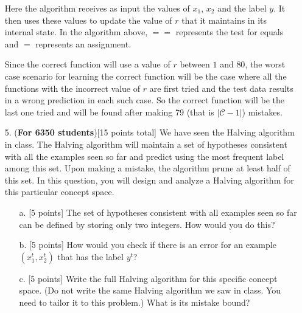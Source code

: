 \begin{enumerate}
Here the algorithm receives as input the values of $x_1$, $x_2$ and the label $y$. It then uses these values to update the value of $r$ that it maintains in its internal state. In the algorithm above, $==$ represents the test for equals and $=$ represents an assignment.

Since the correct function will use a value of $r$ between $1$ and $80$, the worst case scenario for learning the correct function will be the case where all the functions with the incorrect value of $r$ are first tried and the test data results in a wrong prediction in each such case. So the correct function will be the last one tried and will be found after making 79 (that is $\left | \mathcal{C} - 1 \right |$) mistakes. 

\item[5.] ({\bf For 6350 students})[15 points total] We have seen the
  Halving algorithm in class. The Halving algorithm will maintain a
  set of hypotheses consistent with all the examples seen so far and
  predict using the most frequent label among this set. Upon making a
  mistake, the algorithm prune at least half of this set. In this
  question, you will design and analyze a Halving algorithm for this
  particular concept space.

  \begin{enumerate}
  \item[a.] [5 points] The set of hypotheses consistent with all
    examples seen so far can be defined by storing only two integers.
    How would you do this?
  \item[b.] [5 points] How would you check if there is an error for an
    example $(x_1^t, x_2^t)$ that has the label $y^t$?
  \item[c.] [5 points] Write the full Halving algorithm for this
    specific concept space. (Do not write the same Halving algorithm
    we saw in class. You need to tailor it to this problem.) What is
    its mistake bound?
  \end{enumerate}

\end{enumerate}


